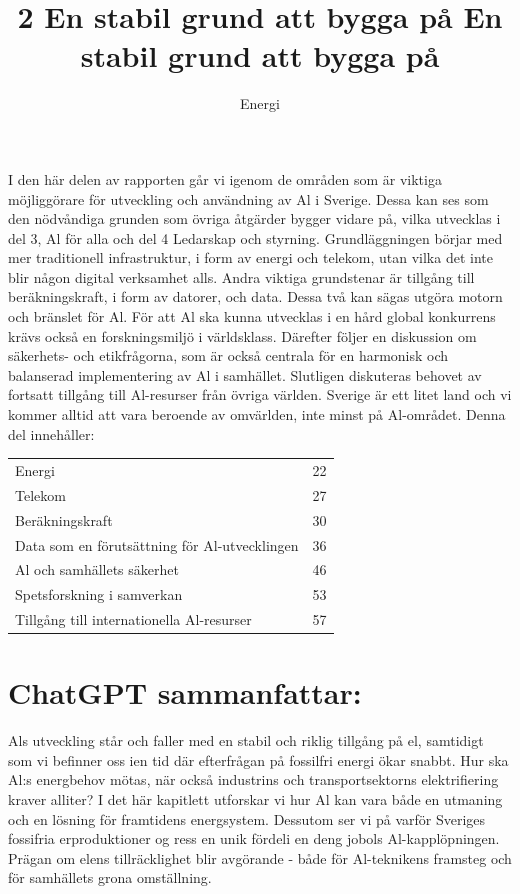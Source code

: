 {{{\title{
2 En stabil grund att bygga på
}
I den här delen av rapporten går vi igenom de områden som är viktiga möjliggörare för utveckling och användning av Al i Sverige. Dessa kan ses som den nödvåndiga grunden som övriga åtgärder bygger vidare på, vilka utvecklas i del 3, Al för alla och del 4 Ledarskap och styrning.
Grundläggningen börjar med mer traditionell infrastruktur, i form av energi och telekom, utan vilka det inte blir någon digital verksamhet alls. Andra viktiga grundstenar är tillgång till beräkningskraft, i form av datorer, och data. Dessa två kan sägas utgöra motorn och bränslet för Al. För att Al ska kunna utvecklas i en hård global konkurrens krävs också en forskningsmiljö i världsklass. Därefter följer en diskussion om säkerhets- och etikfrågorna, som är också centrala för en harmonisk och balanserad implementering av Al i samhället. Slutligen diskuteras behovet av fortsatt tillgång till Al-resurser från övriga världen. Sverige är ett litet land och vi kommer alltid att vara beroende av omvärlden, inte minst på Al-området.
Denna del innehåller:
\begin{tabular}{lr} 
Energi & 22 \\
Telekom & 27 \\
Beräkningskraft & 30 \\
Data som en förutsättning för Al-utvecklingen & 36 \\
Al och samhällets säkerhet & 46 \\
Spetsforskning i samverkan & 53 \\
Tillgång till internationella Al-resurser & 57
\end{tabular}

\title{
En stabil grund att bygga på
}
\author{
Energi
}
\section*{ChatGPT sammanfattar:}
Als utveckling står och faller med en stabil och riklig tillgång på el, samtidigt som vi befinner oss ien tid där efterfrågan på fossilfri energi ökar snabbt. Hur ska Al:s energ\©behov mötas, när också industrins och transportsektorns elektrifiering kraver alliter?
I det här kapitlett utforskar vi hur Al kan vara både en utmaning och en lösning för framtidens energsystem. Dessutom ser vi på varför Sveriges fossifria erproduktioner og ress en unik fördeli en deng jobols Al-kapplöpningen. Prägan om elens tillräcklighet blir avgörande - både för Al-teknikens framsteg och för samhällets grona omställning.
}}}

